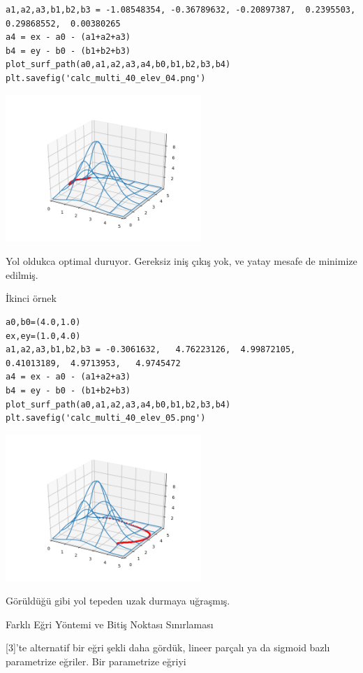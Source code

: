 \documentclass[12pt,fleqn]{article}\usepackage{../../common}
\begin{document}
\begin{verbatim}
a1,a2,a3,b1,b2,b3 = -1.08548354, -0.36789632, -0.20897387,  0.2395503,   0.29868552,  0.00380265
a4 = ex - a0 - (a1+a2+a3)
b4 = ey - b0 - (b1+b2+b3)
plot_surf_path(a0,a1,a2,a3,a4,b0,b1,b2,b3,b4)
plt.savefig('calc_multi_40_elev_04.png')
\end{verbatim}

\includegraphics[width=20em]{calc_multi_40_elev_04.png}

Yol oldukca optimal duruyor. Gereksiz iniş çıkış yok, ve yatay mesafe de
minimize edilmiş. 

İkinci örnek 

\begin{verbatim}
a0,b0=(4.0,1.0)
ex,ey=(1.0,4.0)
a1,a2,a3,b1,b2,b3 = -0.3061632,   4.76223126,  4.99872105,  0.41013189,  4.9713953,   4.9745472 
a4 = ex - a0 - (a1+a2+a3)
b4 = ey - b0 - (b1+b2+b3)
plot_surf_path(a0,a1,a2,a3,a4,b0,b1,b2,b3,b4)
plt.savefig('calc_multi_40_elev_05.png')
\end{verbatim}

\includegraphics[width=20em]{calc_multi_40_elev_05.png}

Görüldüğü gibi yol tepeden uzak durmaya uğraşmış.

Farklı Eğri Yöntemi ve Bitiş Noktası Sınırlaması

[3]'te alternatif bir eğri şekli daha gördük, lineer parçalı ya da sigmoid
bazlı parametrize eğriler. Bir parametrize eğriyi 
\end{document}
